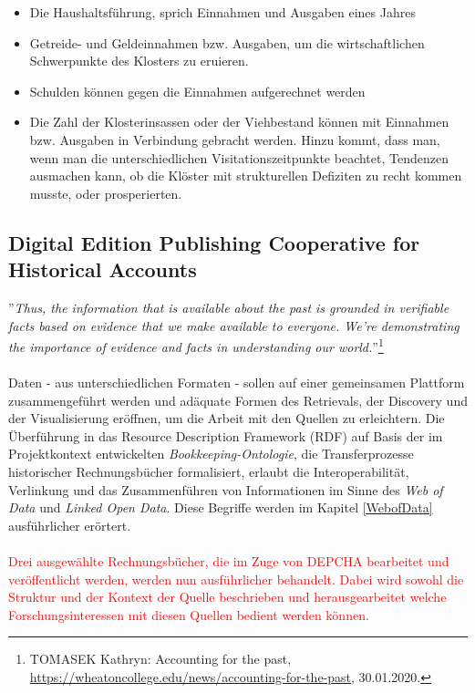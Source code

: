 \documentclass[12pt,a4paper]{article}
\begin{document}
\begin{itemize}
\item Die Haushaltsführung, sprich Einnahmen und Ausgaben eines Jahres 
\item Getreide- und Geldeinnahmen bzw. Ausgaben, um die wirtschaftlichen Schwerpunkte des Klosters zu eruieren.
\item Schulden können gegen die Einnahmen aufgerechnet werden 
\item Die Zahl der Klosterinsassen oder der Viehbestand können mit Einnahmen bzw. Ausgaben in Verbindung gebracht werden. Hinzu kommt, dass man, wenn man die unterschiedlichen Visitationszeitpunkte beachtet,
Tendenzen ausmachen kann, ob die Klöster mit strukturellen Defiziten zu recht kommen musste, oder prosperierten.
\end{itemize} 

\newpage
\subsection{Digital Edition Publishing Cooperative for Historical Accounts}
\label{DEPCHA}

''\textit{Thus, the information that is available about the past is grounded in verifiable facts based on evidence that we make available to everyone. We’re demonstrating the importance of evidence and facts in understanding our world.}''\footnote{TOMASEK Kathryn: Accounting for the past, \url{https://wheatoncollege.edu/news/accounting-for-the-past}, 30.01.2020.}
\\
\\
Daten - aus unterschiedlichen Formaten - sollen auf einer gemeinsamen Plattform zusammengeführt werden und adäquate Formen des Retrievals, der Discovery und der Visualisierung eröffnen, um die Arbeit mit den Quellen zu erleichtern. Die Überführung in das Resource Description Framework (RDF) auf Basis der im Projektkontext entwickelten \textit{Bookkeeping-Ontologie}, die Transferprozesse historischer Rechnungsbücher formalisiert, erlaubt die Interoperabilität, Verlinkung und das Zusammenführen von Informationen im Sinne des \textit{Web of Data} und \textit{Linked Open Data}. Diese Begriffe werden im Kapitel \ref{WebofData} ausführlicher erörtert.
\\
\\
\textcolor{red}{
Drei ausgewählte Rechnungsbücher, die im Zuge von DEPCHA bearbeitet und veröffentlicht werden, werden nun ausführlicher behandelt. Dabei wird sowohl die Struktur und der Kontext der Quelle beschrieben und herausgearbeitet welche Forschungsinteressen mit diesen Quellen bedient werden können. 
}
\end{document}
